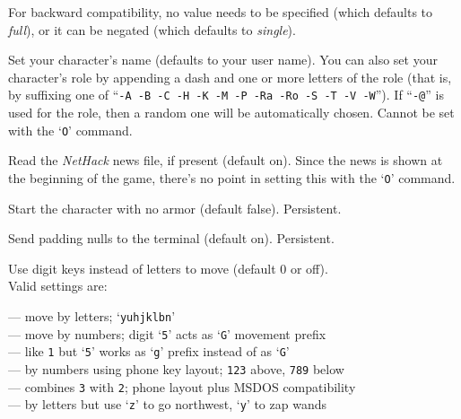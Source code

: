 For backward compatibility, no value needs to be specified (which
defaults to {\it full\/}), or it can be negated (which defaults
to {\it single\/}). 
\item[\ib{name}]
Set your character's name (defaults to your user name).  You can also
set your character's role by appending a dash and one or more letters of
the role (that is, by suffixing one of
``{\tt -A -B -C -H -K -M -P -Ra -Ro -S -T -V -W}'').
If ``{\tt -@}'' is used for the role, then a random one will be
automatically chosen.
Cannot be set with the `{\tt O}' command.
\item[\ib{news}]
Read the {\it NetHack\/} news file, if present (default on).
Since the news is shown at the beginning of the game, there's no point
in setting this with the `{\tt O}' command.
\item[\ib{nudist}]
Start the character with no armor (default false).  Persistent.
\item[\ib{null}]
Send padding nulls to the terminal (default on).  Persistent.
\item[\ib{number\verb+_+pad}]
Use digit keys instead of letters to move (default 0 or off).\\
Valid settings are:

\newlength{\mwidth}
\settowidth{\mwidth}{\tt -0}
\newcommand{\numbox}[1]{\makebox[\mwidth][r]{{\tt #1}}}
\numbox{0} --- move by letters; `{\tt yuhjklbn}'\\
\numbox{1} --- move by numbers; digit `{\tt 5}' acts as `{\tt G}' movement prefix\\
\numbox{2} --- like {\tt 1} but `{\tt 5}' works as `{\tt g}' prefix instead of as `{\tt G}'\\
\numbox{3} --- by numbers using phone key layout; {\tt 123} above, {\tt 789} below\\
\numbox{4} --- combines {\tt 3} with {\tt 2}; phone layout plus MSDOS compatibility\\
\numbox{-1} --- by letters but use `{\tt z}' to go northwest, `{\tt y}' to zap wands

